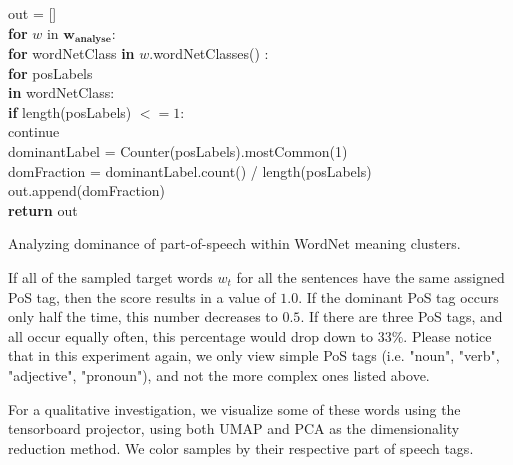 \documentclass[a4paper,12pt,twoside,openright]{report}
\begin{document}
\begin{algorithm}[H]
\SetAlgoLined
{}

out = [] \\

\textbf{for}  $w$ in $\mathbf{w_{\text{analyse}}}$:  \\
\quad \quad \textbf{for} wordNetClass \textbf{in} $w$.wordNetClasses() :  \\
\quad \quad \quad \textbf{for} posLabels \\
\quad \quad \quad \textbf{in} wordNetClass:  \\

\quad \quad \quad \quad \textbf{if} length(posLabels) $<= 1$: \\
\quad \quad \quad \quad \quad \quad  continue \\

\quad \quad \quad \quad dominantLabel = Counter(posLabels).mostCommon(1) \\

\quad \quad \quad \quad domFraction = dominantLabel.count() / length(posLabels) \\

\quad \quad \quad \quad out.append(domFraction) \\


\textbf{return} out
 
 \caption{Analyzing dominance of part-of-speech within WordNet meaning clusters.}
\end{algorithm}

If all of the sampled target words $w_t$ for all the sentences have the same assigned PoS tag, then the score results in a value of $1.0$.
If the dominant PoS tag occurs only half the time, this number decreases to $0.5$.
If there are three PoS tags, and all occur equally often, this percentage would drop down to $33\%$.
Please notice that in this experiment again, we only view simple PoS tags (i.e. "noun", "verb", "adjective", "pronoun"), and not the more complex ones listed above.

For a qualitative investigation, we visualize some of these words using the tensorboard projector, using both UMAP and PCA as the dimensionality reduction method.
We color samples by their respective part of speech tags.
\end{document}
